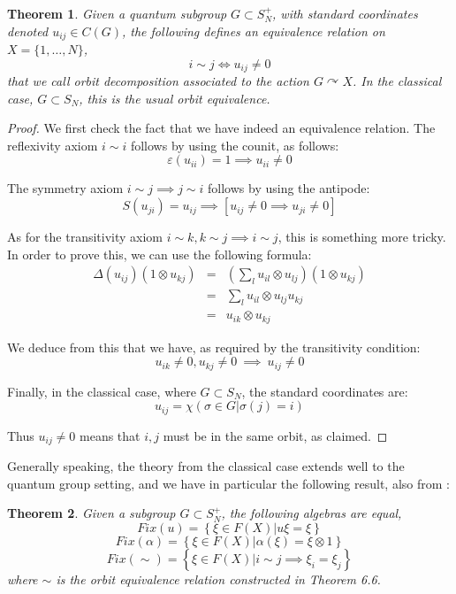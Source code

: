 \documentclass[12pt]{amsbook}
\newtheorem{theorem}{Theorem}[chapter]
\begin{document}
\begin{theorem}
Given a quantum subgroup $G\subset S_N^+$, with standard coordinates denoted $u_{ij}\in C(G)$, the following defines an equivalence relation on $X=\{1,\ldots,N\}$,
$$i\sim j\iff u_{ij}\neq0$$
that we call orbit decomposition associated to the action $G\curvearrowright X$. In the classical case, $G\subset S_N$, this is the usual orbit equivalence.
\end{theorem}

\begin{proof}
We first check the fact that we have indeed an equivalence relation. The reflexivity axiom $i\sim i$ follows by using the counit, as follows:
$$\varepsilon(u_{ii})=1
\implies u_{ii}\neq0$$

The symmetry axiom $i\sim j\implies j\sim i$ follows by using the antipode:
$$S(u_{ji})=u_{ij}\implies[u_{ij}\neq0\implies u_{ji}\neq0]$$

As for the transitivity axiom $i\sim k,k\sim j\implies i\sim j$, this is something more tricky. In order to prove this, we can use the following formula:
\begin{eqnarray*}
\Delta(u_{ij})(1\otimes u_{kj})
&=&\left(\sum_lu_{il}\otimes u_{lj}\right)(1\otimes u_{kj})\\
&=&\sum_lu_{il}\otimes u_{lj}u_{kj}\\
&=&u_{ik}\otimes u_{kj}
\end{eqnarray*}

We deduce from this that we have, as required by the transitivity condition:
$$u_{ik}\neq0,u_{kj}\neq0\ \implies\ u_{ij}\neq0$$

Finally, in the classical case, where $G\subset S_N$, the standard coordinates are:
$$u_{ij}=\chi\left(\sigma\in G\Big|\sigma(j)=i\right)$$

Thus $u_{ij}\neq0$ means that $i,j$ must be in the same orbit, as claimed.
\end{proof}

Generally speaking, the theory from the classical case extends well to the quantum group setting, and we have in particular the following result, also from \cite{bi4}:


\begin{theorem}
Given a subgroup $G\subset S_N^+$, the following algebras are equal,
$$Fix(u)=\left\{\xi\in F(X)\Big|u\xi=\xi\right\}$$
$$Fix(\alpha)=\left\{\xi\in F(X)\Big|\alpha(\xi)=\xi\otimes1\right\}$$
$$Fix(\sim)=\left\{\xi\in F(X)\Big|i\sim j\implies \xi_i=\xi_j\right\}$$
where $\sim$ is the orbit equivalence relation constructed in Theorem 6.6.
\end{theorem}
\end{document}

